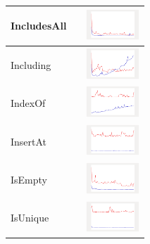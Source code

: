 \begin{longtable}{ m{2.5cm} m{8cm} m{2cm} }
IncludesAll &

&
\includegraphics[width=2cm]{../graphs/orderedset/small/IncludesAll}
\\\hline

Including &

&
\includegraphics[width=2cm]{../graphs/orderedset/small/Including}
\\\hline

IndexOf &

&
\includegraphics[width=2cm]{../graphs/orderedset/small/IndexOf}
\\\hline

InsertAt &

&
\includegraphics[width=2cm]{../graphs/orderedset/small/InsertAt}
\\\hline

IsEmpty &

&
\includegraphics[width=2cm]{../graphs/orderedset/small/IsEmpty}
\\\hline

IsUnique &

&
\includegraphics[width=2cm]{../graphs/orderedset/small/isUnique}
\\\hline


\end{longtable}
